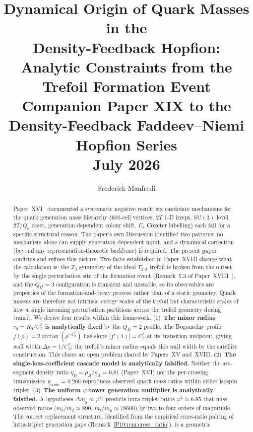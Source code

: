 \documentclass[11pt,a4paper]{article}
\title{\textbf{Dynamical Origin of Quark Masses in the\\
Density-Feedback Hopfion:\\
Analytic Constraints from the Trefoil Formation Event}
\\[0.6em]
{\large Companion Paper XIX to the Density-Feedback
Faddeev--Niemi Hopfion Series}
\\[0.6em]
\large July 2026}
\author{Frederick Manfredi}
\date{}
\theoremstyle{definition}\newtheorem{definition}[theorem]{Definition}
\theoremstyle{remark}
\newcommand{\vp}{\varphi}
\newcommand{\SU}{\mathrm{SU}}
\newcommand{\twoT}{2T}
\newcommand{\QH}{Q_H}
\newcommand{\Zthree}{\mathbb{Z}_3}
\begin{document}
\maketitle

\begin{abstract}
Paper~XVI~\cite{Paper16} documented a systematic negative result:
six candidate mechanisms for the quark generation mass hierarchy
(600-cell vertices, $\twoT$ 1-D irreps, $\SU(3)$ level, $\twoT/Q_8$
coset, generation-dependent colour shift, $E_8$ Coxeter labelling)
each fail for a specific structural reason.  The paper's own
Discussion identified two patterns: no mechanism alone
can supply generation-dependent input, and a dynamical correction
(beyond any representation-theoretic backbone) is required.
The present paper confirms and refines this picture.  Two facts
established in Paper~XVIII change what the calculation is: the
$\Zthree$ symmetry of the ideal $T_{2,3}$ trefoil is broken from the
outset by the single perturbation site of the formation event
(Remark~5.3 of Paper~XVIII~\cite{Paper18}), and %
the $\QH=3$ configuration is transient and unstable, so its
observables are properties of the formation-and-decay process
rather than of a static geometry.  Quark masses are therefore not
intrinsic energy scales of the trefoil but characteristic scales of
how a single incoming perturbation partitions across the trefoil
geometry during transit.
We derive four results within this framework.
(1)~\textbf{The minor radius $r_0=R_0/C_2^*$ is analytically fixed}
by the $\QH=2$ profile.  The Bogomolny profile
$f(\rho)=2\arctan(\rho^{-C_2^*})$ has slope $|f'(1)|=C_2^*$ at its
transition midpoint, giving wall width $\Delta\rho=1/C_2^*$; the
trefoil's minor radius equals this wall width by the satellite
construction.  This closes an open problem shared by Papers~XV
and~XVIII.
(2)~\textbf{The single-loss-coefficient cascade model is
analytically falsified.}  Neither the arc-segment density ratio
$\eta_B=\rho_B/\rho_A=0.81$ (Paper~XVI) nor the per-crossing
transmission $\eta_{\mathrm{cross}}=0.266$ reproduces observed
quark mass ratios within either isospin triplet.
(3)~\textbf{The uniform $\vp$-tower generation multiplier is
analytically falsified.} A hypothesis $\Delta m_g\propto\vp^{2g}$
predicts intra-triplet ratios $\vp^{4}\approx6.85$ that miss
observed ratios $(m_b/m_d\approx 890$, $m_t/m_u\approx 78600)$ by
two to four orders of magnitude.  The correct replacement structure,
identified from the empirical cross-ratio pairing of intra-triplet
generation gaps (Remark~\ref{P19:rem:cross_ratio}), is a geometric

\end{abstract}
\end{document}
